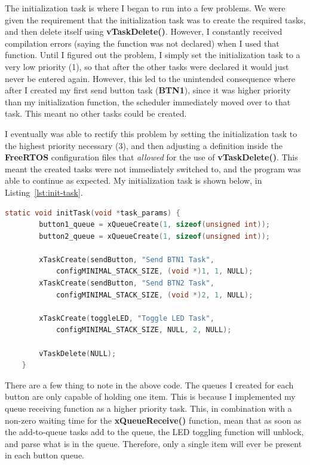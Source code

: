 \documentclass[a4paper, 12pt]{article}
\begin{document}
The initialization task is where I began to run into a few problems. We were given the requirement that the initialization task was to create the required tasks, and then delete itself using \textbf{vTaskDelete()}. However, I constantly received compilation errors (saying the function was not declared) when I used that function. Until I figured out the problem, I simply set the initialization task to a very low priority (1), so that after the other tasks were declared it would just never be entered again. However, this led to the unintended consequence where after I created my first send button task (\textbf{BTN1}), since it was higher priority than my initialization function, the scheduler immediately moved over to that task. This meant no other tasks could be created.

I eventually was able to rectify this problem by setting the initialization task to the highest priority necessary (3), and then adjusting a definition inside the \textbf{FreeRTOS} configuration files that \emph{allowed} for the use of \textbf{vTaskDelete()}. This meant the created tasks were not immediately switched to, and the program was able to continue as expected. My initialization task is shown below, in Listing~\ref{lst:init-task}.

	\begin{mdframed}[backgroundcolor=code-gray, roundcorner=10pt,
								innerleftmargin=5, innertopmargin=5, innerbottommargin=5]	
	\begin{lstlisting}[language=C, caption=Initialization Task, tabsize=2, label={lst:init-task}]
	static void initTask(void *task_params) {
		button1_queue = xQueueCreate(1, sizeof(unsigned int));
		button2_queue = xQueueCreate(1, sizeof(unsigned int));
	
		xTaskCreate(sendButton, "Send BTN1 Task", 
			configMINIMAL_STACK_SIZE, (void *)1, 1, NULL);
		xTaskCreate(sendButton, "Send BTN2 Task", 
			configMINIMAL_STACK_SIZE, (void *)2, 1, NULL);
	
		xTaskCreate(toggleLED, "Toggle LED Task", 
			configMINIMAL_STACK_SIZE, NULL, 2, NULL);
	
		vTaskDelete(NULL);
	}
	\end{lstlisting}
	\end{mdframed}
	
There are a few thing to note in the above code. The queues I created for each button are only capable of holding one item. This is because I implemented my queue receiving function as a higher priority task. This, in combination with a non-zero waiting time for the \textbf{xQueueReceive()} function, mean that as soon as the add-to-queue tasks add to the queue, the LED toggling function will unblock, and parse what is in the queue. Therefore, only a single item will ever be present in each button queue.
\end{document}
